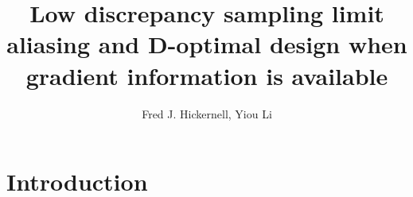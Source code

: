 \documentclass[preprint,12pt]{elsarticle}
\begin{document}
\begin{frontmatter}



\title{Low discrepancy sampling limit aliasing and D-optimal design when gradient information is available}


\author{Fred J. Hickernell, Yiou Li}

\address{Applied Mathematics Office, Engineering $1$ Building $10$ West $32$nd Street, Chicago, IL $60616$}

\begin{abstract}

\end{abstract}

\begin{keyword}


\end{keyword}

\end{frontmatter}


\section{Introduction}
\end{document}
